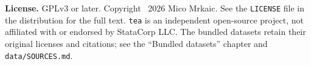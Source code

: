 \begin{center}
\begin{minipage}{0.85\textwidth}
\vspace{1em}
\textbf{License.}  GPLv3 or later.  Copyright \textcopyright\ 2026
Mico Mrkaic.  See the \texttt{LICENSE} file in the distribution for
the full text.  \texttt{tea} is an independent open-source project,
not affiliated with or endorsed by StataCorp LLC.  The bundled datasets
retain their original licenses and citations; see the ``Bundled
datasets'' chapter and \texttt{data/SOURCES.md}.
\end{minipage}
\end{center}
\clearpage
